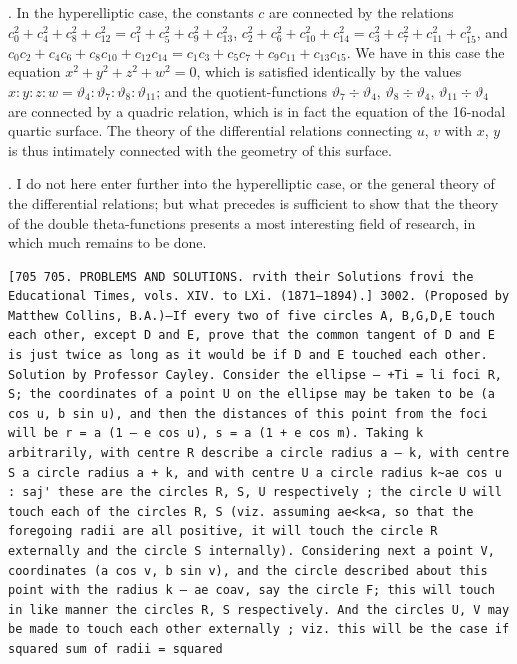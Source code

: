 \documentclass[12pt]{article}
\theoremstyle{plain}
\begin{document}
. In the hyperelliptic case, the constants $c$ are connected by the relations $c_0^2 + c_4^2 + c_8^2 + c_{12}^2 = c_1^2 + c_5^2 + c_9^2 + c_{13}^2$, $c_2^2 + c_6^2 + c_{10}^2 + c_{14}^2 = c_3^2 + c_7^2 + c_{11}^2 + c_{15}^2$, and $c_0 c_2 + c_4 c_6 + c_8 c_{10} + c_{12} c_{14} = c_1 c_3 + c_5 c_7 + c_9 c_{11} + c_{13} c_{15}$. We have in this case the equation $x^2 + y^2 + z^2 + w^2 = 0$, which is satisfied identically by the values $x : y : z : w = \vartheta_4 : \vartheta_7 : \vartheta_8 : \vartheta_{11}$; and the quotient-functions $\vartheta_7 \div \vartheta_4$, $\vartheta_8 \div \vartheta_4$, $\vartheta_{11} \div \vartheta_4$ are connected by a quadric relation, which is in fact the equation of the 16-nodal quartic surface. The theory of the differential relations connecting $u$, $v$ with $x$, $y$ is thus intimately connected with the geometry of this surface.

\newpage
\setcounter{page}{565}

. I do not here enter further into the hyperelliptic case, or the general theory of the differential relations; but what precedes is sufficient to show that the theory of the double theta-functions presents a most interesting field of research, in which much remains to be done.

\bigskip






\newpage
\setcounter{page}{566}
\begin{verbatim}
[705 705. PROBLEMS AND SOLUTIONS. rvith their Solutions frovi the Educational Times, vols. XIV. to LXi. (1871—1894).] 3002. (Proposed by Matthew Collins, B.A.)—If every two of five circles A, B,G,D,E touch each other, except D and E, prove that the common tangent of D and E is just twice as long as it would be if D and E touched each other. Solution by Professor Cayley. Consider the ellipse — +Ti = li foci R, S; the coordinates of a point U on the ellipse may be taken to be (a cos u, b sin u), and then the distances of this point from the foci will be r = a (1 — e cos u), s = a (1 + e cos m). Taking k arbitrarily, with centre R describe a circle radius a — k, with centre S a circle radius a + k, and with centre U a circle radius k~ae cos u : saj' these are the circles R, S, U respectively ; the circle U will touch each of the circles R, S (viz. assuming ae<k<a, so that the foregoing radii are all positive, it will touch the circle R externally and the circle S internally). Considering next a point V, coordinates (a cos v, b sin v), and the circle described about this point with the radius k — ae coav, say the circle F; this will touch in like manner the circles R, S respectively. And the circles U, V may be made to touch each other externally ; viz. this will be the case if squared sum of radii = squared 
\end{verbatim}
\end{document}
